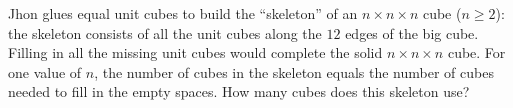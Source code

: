 Jhon glues equal unit cubes to build the ``skeleton'' of an $n\times n\times n$ cube ($n\ge2$): the skeleton consists of all the unit cubes along the $12$ edges of the big cube. Filling in all the missing unit cubes would complete the solid $n\times n\times n$ cube. For one value of $n$, the number of cubes in the skeleton equals the number of cubes needed to fill in the empty spaces. How many cubes does this skeleton use?

